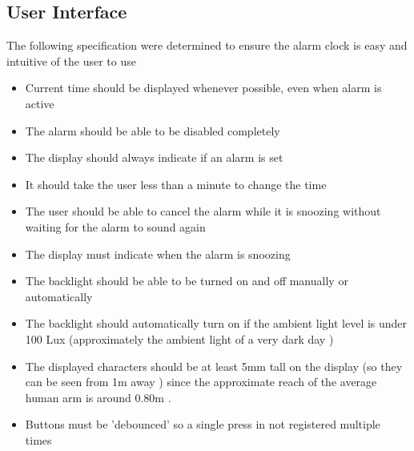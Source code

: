 \documentclass{article}
\begin{document}
\subsection{User Interface}
The following specification were determined to ensure the alarm clock is easy and intuitive of the user to use
\begin{itemize}
    \item Current time should be displayed whenever possible, even when alarm is active
    \item The alarm should be able to be disabled completely
    \item The display should always indicate if an alarm is set
    \item It should take the user less than a minute to change the time
    \item The user should be able to cancel the alarm while it is snoozing without waiting for the alarm to sound again
    \item The display must indicate when the alarm is snoozing
    \item The backlight should be able to be turned on and off manually or automatically
    \item The backlight should automatically turn on if the ambient light level is under 100 Lux (approximately the ambient light of a very dark day \cite{lux})
    \item The displayed characters should be at least 5mm tall on the display (so they can be seen from 1m away \cite{letter}) since the approximate reach of the average human arm is around 0.80m \cite{arm}.
    \item Buttons must be 'debounced' so a single press in not registered multiple times
\end{itemize}
\end{document}
